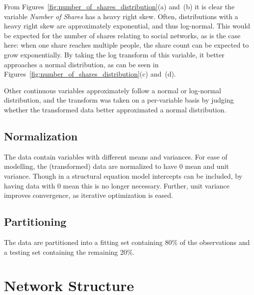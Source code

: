 \documentclass{article}
\begin{document}
From Figures~\ref{fig:number_of_shares_distribution}(a) and~(b) it is clear the variable \emph{Number of 
Shares} has a heavy right skew.
Often, distributions with a heavy right skew are approximately exponential, and thus log-normal.
This would be expected for the number of shares relating to social networks, as is the case here: when one share reaches multiple people, the share count can be expected to grow exponentially.
By taking the log transform of this variable, it better approaches a normal distribution, as can be seen in Figures~\ref{fig:number_of_shares_distribution}(c) and~(d).

Other continuous variables approximately follow a normal or log-normal distribution, and the transform was taken on a per-variable basis by judging whether the transformed data better approximated a normal distribution.

\subsection{Normalization}
The data contain variables with different means and variances.
For ease of modelling, the (transformed) data are normalized to have 0 mean and unit variance.
Though in a structural equation model intercepts can be included, by having data with 0 mean this is no longer necessary.
Further, unit variance improves convergence, as iterative optimization is eased.

\subsection{Partitioning}
The data are partitioned into a fitting set containing 80\% of the observations and a testing set containing the remaining 20\%.

\section{Network Structure}
\end{document}
